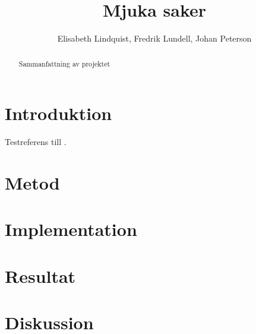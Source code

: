 \documentclass[10pt,a4paper]{article}
\author{Elisabeth Lindquist, Fredrik Lundell, Johan Peterson}
\title{Mjuka saker}
\begin{document}
\maketitle
\begin{abstract}
Sammanfattning av projektet
\end{abstract}
\section{Introduktion}
Testreferens till \cite{1401245}.
\section{Metod}
\section{Implementation}
\section{Resultat}
\section{Diskussion}


\end{document}

